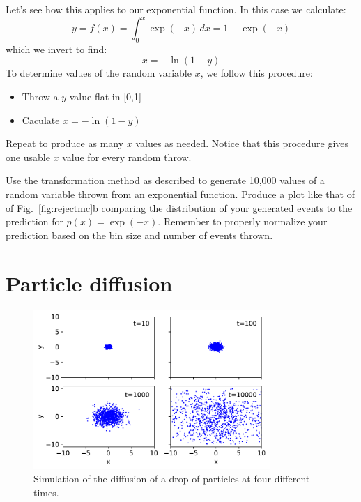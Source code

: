 Let's see how this applies to our exponential function.  In this case we calculate:
\begin{displaymath}
y = f(x) = \int_0^x \exp(-x) \, dx = 1 - \exp(-x)
\end{displaymath}  
which we invert to find:
\begin{displaymath}
x = - \ln(1-y)
\end{displaymath}  
To determine values of the random variable $x$, we follow this procedure:
\begin{itemize}
 \item Throw a $y$ value flat in [0,1]
 \item Caculate $x = -\ln(1-y)$
\end{itemize}
Repeat to produce as many $x$ values as needed.  Notice that this
procedure gives one usable $x$ value for every random throw.

\begin{plot} \end{plot}
Use the transformation method as described to generate 10,000 values
of a random variable thrown from an exponential function.  Produce a
plot like that of of Fig.~\ref{fig:rejectmc}b comparing the
distribution of your generated events to the prediction for $p(x) =
\exp(-x)$.  Remember to properly normalize your prediction based on
the bin size and number of events thrown.

\newpage
\section{Particle diffusion}

\begin{figure}[htbp]
\begin{center}
  \includegraphics[width=0.80\textwidth]{figs/labs/monte_carlo/diffusion.pdf}
  \caption{Simulation of the diffusion of a drop of particles at four different times.}
\label{fig:diffusion}
\end{center}
\end{figure}

